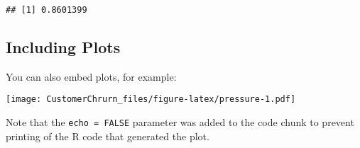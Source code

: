 \documentclass[]{article}
\newenvironment{Shaded}{\begin{snugshade}}{\end{snugshade}}
\newcommand{\KeywordTok}[1]{\textcolor[rgb]{0.13,0.29,0.53}{\textbf{#1}}}
\newcommand{\StringTok}[1]{\textcolor[rgb]{0.31,0.60,0.02}{#1}}
\newcommand{\OperatorTok}[1]{\textcolor[rgb]{0.81,0.36,0.00}{\textbf{#1}}}
\newcommand{\NormalTok}[1]{#1}
\begin{document}
\begin{Shaded}
\end{Shaded}

\begin{verbatim}
## [1] 0.8601399
\end{verbatim}

\subsection{Including Plots}\label{including-plots}

You can also embed plots, for example:

\texttt{[image: CustomerChrurn\_files/figure-latex/pressure-1.pdf]}

Note that the \texttt{echo\ =\ FALSE} parameter was added to the code
chunk to prevent printing of the R code that generated the plot.
\end{document}
